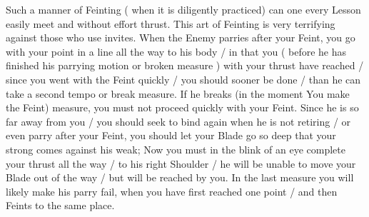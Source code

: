 \newpage


\newpage



Such a manner  of Feinting ( when it is diligently practiced) can one
every Lesson easily meet and without effort thrust. This art of
Feinting is very terrifying against those who use invites. When the
Enemy parries after your Feint, you go with your point in a line all
the way to his body / in that you ( before he has finished his
parrying motion or broken measure ) with your thrust have reached /
since you went with the Feint quickly / you should sooner be done /
than he can take a second tempo or break measure. If he breaks (in the
moment You make the Feint) measure, you must not proceed quickly with
your Feint. Since he is so far away from you / you should seek to bind
again when he is not retiring / or even parry after your Feint, you
should let your Blade go so deep that your strong comes against his
weak; Now you must in the blink of an eye complete your thrust all the
way / to his right Shoulder / he will be unable to move your Blade out
of the way / but will be reached by you. In the last measure you will
likely make his parry fail, when you have first reached one point /
and then Feints to the same place.

